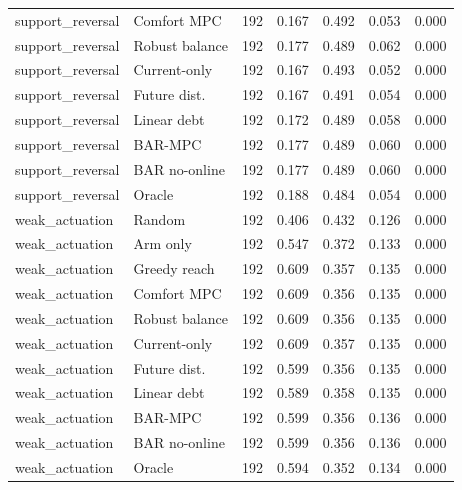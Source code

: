 \begin{longtable}{llrrrrr}
support\_reversal & Comfort MPC & 192 & 0.167 & 0.492 & 0.053 & 0.000 \\
support\_reversal & Robust balance & 192 & 0.177 & 0.489 & 0.062 & 0.000 \\
support\_reversal & Current-only & 192 & 0.167 & 0.493 & 0.052 & 0.000 \\
support\_reversal & Future dist. & 192 & 0.167 & 0.491 & 0.054 & 0.000 \\
support\_reversal & Linear debt & 192 & 0.172 & 0.489 & 0.058 & 0.000 \\
support\_reversal & BAR-MPC & 192 & 0.177 & 0.489 & 0.060 & 0.000 \\
support\_reversal & BAR no-online & 192 & 0.177 & 0.489 & 0.060 & 0.000 \\
support\_reversal & Oracle & 192 & 0.188 & 0.484 & 0.054 & 0.000 \\
weak\_actuation & Random & 192 & 0.406 & 0.432 & 0.126 & 0.000 \\
weak\_actuation & Arm only & 192 & 0.547 & 0.372 & 0.133 & 0.000 \\
weak\_actuation & Greedy reach & 192 & 0.609 & 0.357 & 0.135 & 0.000 \\
weak\_actuation & Comfort MPC & 192 & 0.609 & 0.356 & 0.135 & 0.000 \\
weak\_actuation & Robust balance & 192 & 0.609 & 0.356 & 0.135 & 0.000 \\
weak\_actuation & Current-only & 192 & 0.609 & 0.357 & 0.135 & 0.000 \\
weak\_actuation & Future dist. & 192 & 0.599 & 0.356 & 0.135 & 0.000 \\
weak\_actuation & Linear debt & 192 & 0.589 & 0.358 & 0.135 & 0.000 \\
weak\_actuation & BAR-MPC & 192 & 0.599 & 0.356 & 0.136 & 0.000 \\
weak\_actuation & BAR no-online & 192 & 0.599 & 0.356 & 0.136 & 0.000 \\
weak\_actuation & Oracle & 192 & 0.594 & 0.352 & 0.134 & 0.000 \\
\bottomrule
\end{longtable}
